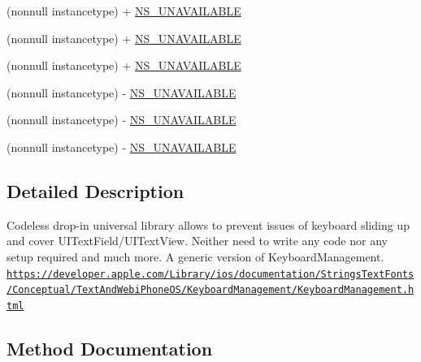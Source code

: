  \begin{DoxyCompactItemize}
\item 
(nonnull instancetype) + \mbox{\hyperlink{interface_i_q_keyboard_manager_a4eb45516efb28bba1b8dd12ba98c9e48}{N\+S\+\_\+\+U\+N\+A\+V\+A\+I\+L\+A\+B\+LE}}
\item 
(nonnull instancetype) + \mbox{\hyperlink{interface_i_q_keyboard_manager_a4eb45516efb28bba1b8dd12ba98c9e48}{N\+S\+\_\+\+U\+N\+A\+V\+A\+I\+L\+A\+B\+LE}}
\item 
(nonnull instancetype) + \mbox{\hyperlink{interface_i_q_keyboard_manager_a4eb45516efb28bba1b8dd12ba98c9e48}{N\+S\+\_\+\+U\+N\+A\+V\+A\+I\+L\+A\+B\+LE}}
\item 
(nonnull instancetype) -\/ \mbox{\hyperlink{interface_i_q_keyboard_manager_a4eb45516efb28bba1b8dd12ba98c9e48}{N\+S\+\_\+\+U\+N\+A\+V\+A\+I\+L\+A\+B\+LE}}
\item 
(nonnull instancetype) -\/ \mbox{\hyperlink{interface_i_q_keyboard_manager_a4eb45516efb28bba1b8dd12ba98c9e48}{N\+S\+\_\+\+U\+N\+A\+V\+A\+I\+L\+A\+B\+LE}}
\item 
(nonnull instancetype) -\/ \mbox{\hyperlink{interface_i_q_keyboard_manager_a4eb45516efb28bba1b8dd12ba98c9e48}{N\+S\+\_\+\+U\+N\+A\+V\+A\+I\+L\+A\+B\+LE}}
\end{DoxyCompactItemize}


\subsection{Detailed Description}
Codeless drop-\/in universal library allows to prevent issues of keyboard sliding up and cover U\+I\+Text\+Field/\+U\+I\+Text\+View. Neither need to write any code nor any setup required and much more. A generic version of Keyboard\+Management. \href{https://developer.apple.com/Library/ios/documentation/StringsTextFonts/Conceptual/TextAndWebiPhoneOS/KeyboardManagement/KeyboardManagement.html}{\tt https\+://developer.\+apple.\+com/\+Library/ios/documentation/\+Strings\+Text\+Fonts/\+Conceptual/\+Text\+And\+Webi\+Phone\+O\+S/\+Keyboard\+Management/\+Keyboard\+Management.\+html} 

\subsection{Method Documentation}
\mbox{\label{interface_i_q_keyboard_manager_a5b51f290fc063aed13cea8483e6f7060}} 
